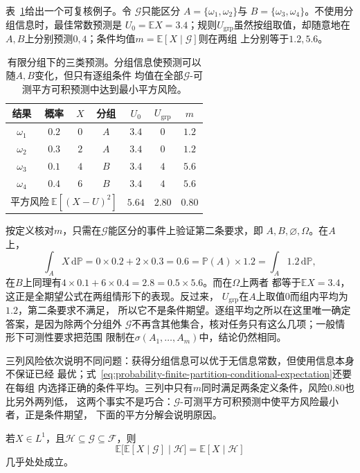 表~\ref{tab:probability-finite-partition-predictions}给出一个可复核例子。令
\(\mathcal{G}\)只能区分
\(A=\{\omega_1,\omega_2\}\)与
\(B=\{\omega_3,\omega_4\}\)。不使用分组信息时，最佳常数预测是
\(U_0=\mathbb{E}X=3.4\)；规则\(U_{\mathrm{grp}}\)虽然按组取值，却随意地在
\(A,B\)上分别预测\(0,4\)；条件均值\(m=\mathbb{E}[X\mid\mathcal{G}]\)则在两组
上分别等于\(1.2,5.6\)。
\begin{table}[htbp]
  \centering
  \small
  \begin{tabular}{ccccccc}
    \toprule
    结果 & 概率 & \(X\) & 分组 & \(U_0\) & \(U_{\mathrm{grp}}\) & \(m\) \\
    \midrule
    \(\omega_1\) & \(0.2\) & \(0\) & \(A\) & \(3.4\) & \(0\) & \(1.2\) \\
    \(\omega_2\) & \(0.3\) & \(2\) & \(A\) & \(3.4\) & \(0\) & \(1.2\) \\
    \(\omega_3\) & \(0.1\) & \(4\) & \(B\) & \(3.4\) & \(4\) & \(5.6\) \\
    \(\omega_4\) & \(0.4\) & \(6\) & \(B\) & \(3.4\) & \(4\) & \(5.6\) \\
    \midrule
    \multicolumn{4}{r}{平方风险\(\ \mathbb{E}[(X-U)^2]\)} &
    \(5.64\) & \(2.80\) & \(0.80\) \\
    \bottomrule
  \end{tabular}
  \caption{有限分组下的三类预测。分组信息使预测可以随\(A,B\)变化，但只有逐组条件
  均值在全部\(\mathcal{G}\)-可测平方可积预测中达到最小平方风险。}
  \label{tab:probability-finite-partition-predictions}
\end{table}
按定义核对\(m\)，只需在\(\mathcal{G}\)能区分的事件上验证第二条要求，即
\(A,B,\varnothing,\Omega\)。在\(A\)上，
\[
  \int_A X\,\mathrm{d}\mathbb{P}
  =0\times0.2+2\times0.3=0.6
  =\mathbb{P}(A)\times1.2
  =\int_A 1.2\,\mathrm{d}\mathbb{P},
\]
在\(B\)上同理有\(4\times0.1+6\times0.4=2.8=0.5\times5.6\)。而在\(\Omega\)上两者
都等于\(\mathbb E X=3.4\)，这正是全期望公式在两组情形下的表现。反过来，
\(U_{\mathrm{grp}}\)在\(A\)上取值\(0\)而组内平均为\(1.2\)，第二条要求不满足，
所以它不是条件期望。逐组平均之所以在这里唯一确定答案，是因为除两个分组外
\(\mathcal{G}\)不再含其他集合，核对任务只有这么几项；一般情形下可测性要求把范围
限制在\(\sigma(A_1,\ldots,A_m)\)中，结论仍然相同。

三列风险依次说明不同问题：获得分组信息可以优于无信息常数，但使用信息本身不保证已经
最优；式~\eqref{eq:probability-finite-partition-conditional-expectation}还要在每组
内选择正确的条件平均。三列中只有\(m\)同时满足两条定义条件，风险\(0.80\)也比另外两列低，
这两个事实不是巧合：\(\mathcal{G}\)-可测平方可积预测中使平方风险最小者，正是条件期望，
下面的平方分解会说明原因。
\begin{theorem}[塔式性质]
\label{thm:probability-tower-property}
若\(X\in L^1\)，且\(\mathcal{H}\subseteq\mathcal{G}\subseteq\mathcal{F}\)，则
\[ \mathbb{E}\bigl[\mathbb{E}[X\mid\mathcal{G}]
  \mid\mathcal{H}\bigr]=\mathbb{E}[X\mid\mathcal{H}] \]
几乎处处成立。
\end{theorem}

